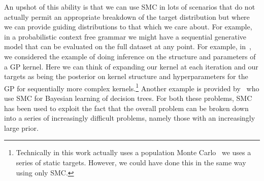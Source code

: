 An upshot of this ability is that we can use SMC in lots of scenarios that do not
actually permit an appropriate breakdown of the target distribution but where we 
can provide guiding distributions to that which we care about.  For example, in a probabilistic
context free grammar we might have a sequential generative model that can be evaluated on the
full dataset at any point.  For example, in~\cite{janz2016probstruct}, we considered the example of doing inference
on the structure and parameters of a GP kernel.  Here we can think of expanding our kernel at each
iteration and our targets as being the posterior on kernel structure and hyperparameters for the GP
for sequentially more complex kernels.\footnote{Technically in this work actually uses a population
	Monte Carlo~\cite{cappe2004population} we uses a series of static targets.  However, we could
	have done this in the same way using only SMC.}  Another example is provided by~\cite{lakshminarayanan2013top}
who use SMC for Bayesian learning of decision trees.  For both these problems, SMC has been used
to exploit the fact that the overall problem can be broken down into a series of increasingly difficult
problems, namely those with an increasingly large prior.